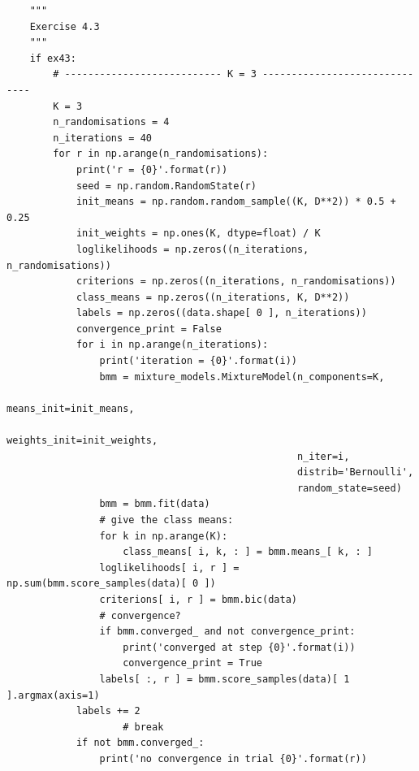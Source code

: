 \begin{verbatim}
    """
    Exercise 4.3
    """
    if ex43:
        # --------------------------- K = 3 ------------------------------
        K = 3
        n_randomisations = 4
        n_iterations = 40
        for r in np.arange(n_randomisations):
            print('r = {0}'.format(r))
            seed = np.random.RandomState(r)
            init_means = np.random.random_sample((K, D**2)) * 0.5 + 0.25
            init_weights = np.ones(K, dtype=float) / K
            loglikelihoods = np.zeros((n_iterations, n_randomisations))
            criterions = np.zeros((n_iterations, n_randomisations))
            class_means = np.zeros((n_iterations, K, D**2))
            labels = np.zeros((data.shape[ 0 ], n_iterations))
            convergence_print = False
            for i in np.arange(n_iterations):
                print('iteration = {0}'.format(i))
                bmm = mixture_models.MixtureModel(n_components=K,
                                                  means_init=init_means,
                                                  weights_init=init_weights,
                                                  n_iter=i,
                                                  distrib='Bernoulli',
                                                  random_state=seed)
                bmm = bmm.fit(data)
                # give the class means:
                for k in np.arange(K):
                    class_means[ i, k, : ] = bmm.means_[ k, : ]
                loglikelihoods[ i, r ] = np.sum(bmm.score_samples(data)[ 0 ])
                criterions[ i, r ] = bmm.bic(data)
                # convergence?
                if bmm.converged_ and not convergence_print:
                    print('converged at step {0}'.format(i))
                    convergence_print = True
                labels[ :, r ] = bmm.score_samples(data)[ 1 ].argmax(axis=1)
            labels += 2
                    # break
            if not bmm.converged_:
                print('no convergence in trial {0}'.format(r))


\end{verbatim}
